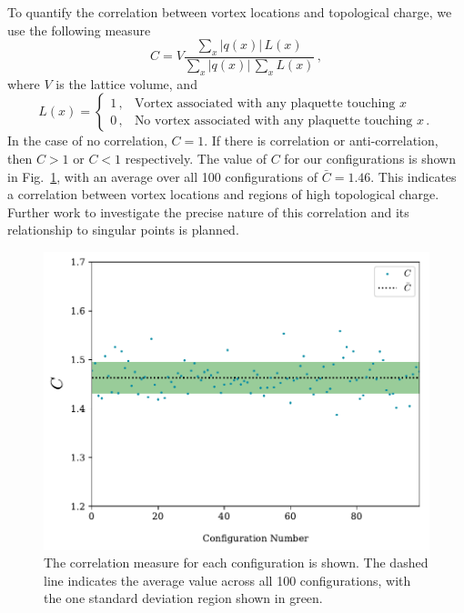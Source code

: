 To quantify the correlation between vortex locations and topological charge, we use the following measure
%
\begin{equation}
C = V\frac{\sum_x |q(x)|\,L(x)}{\sum_x |q(x)|\,\sum_x L(x)}\, ,
\end{equation}
%
where $V$ is the lattice volume, and
%
\begin{equation}
L(x) = 
\begin{cases}
1\, , & \text{Vortex associated with any plaquette touching $x$}\\
0\, , & \text{No vortex associated with any plaquette touching $x$}\, .
\end{cases}
\end{equation}
%
In the case of no correlation, $C=1$. If there is correlation or anti-correlation, then $C>1$ or $C<1$ respectively. The value of $C$ for our configurations is shown in Fig.~\ref{fig:Correlation}, with an average over all 100 configurations of $\bar{C} = 1.46$. This indicates a correlation between vortex locations and regions of high topological charge. Further work to investigate the precise nature of this correlation and its relationship to singular points is planned.\\
%
\begin{figure}[htb!]
\centering
\includegraphics[width=0.8\linewidth]{./Correlation.pdf}
\caption{\label{fig:Correlation} The correlation measure for each configuration is shown. The dashed line indicates the average value across all 100 configurations, with the one standard deviation region shown in green.}
\end{figure}
%

